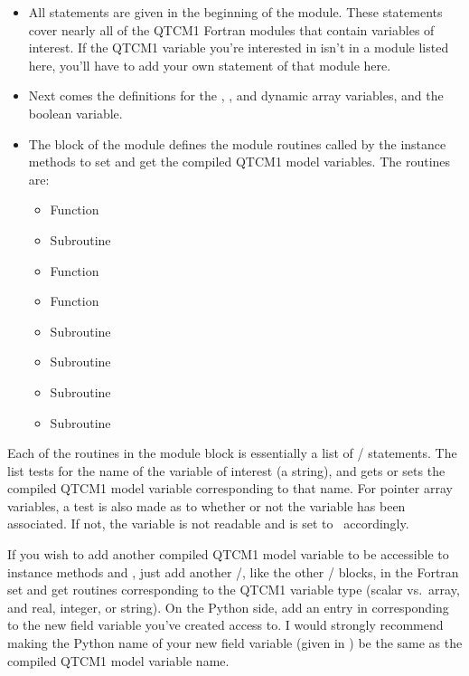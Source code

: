 \begin{itemize}
\item All  statements are given in the beginning of 
	the  module.  These statements cover
	nearly all of the QTCM1 Fortran
	modules that contain variables of interest.  If the
	QTCM1 variable you're interested in isn't in a module
	listed here, you'll have to add your own
	 statement of that module here.

\item Next comes the definitions for the
	,
	, and
	 dynamic array variables, and
	the  boolean variable.

\item The  block of the module defines the module
	routines called by the  instance methods to
	set and get the compiled QTCM1 model variables.  The
	routines are:
	\begin{itemize}
	\item Function 
	\item Subroutine 
	\item Function 
	\item Function 
	\item Subroutine 
	\item Subroutine 
	\item Subroutine 
	\item Subroutine 
	\end{itemize}

\end{itemize}

Each of the routines in the module  block is essentially
a list of / statements.  The list tests for the
name of the variable of interest (a string), and gets or sets the
compiled QTCM1 model variable corresponding to that name.  For pointer
array variables, a test is also made as to whether or not the variable
has been associated.  If not, the variable is not readable
and  is set to \ accordingly.

If you wish to add another compiled QTCM1 model variable to be
accessible to  instance methods 
and , just add another /,
like the other / blocks, in the Fortran set
and get routines corresponding to the QTCM1 variable type (scalar
vs.\ array, and real, integer, or string).  On the Python side, add
an entry in  corresponding to the new field variable
you've created access to.  I would strongly recommend making the
Python name of your new field variable
(given in ) be the same as the compiled
QTCM1 model variable name.



